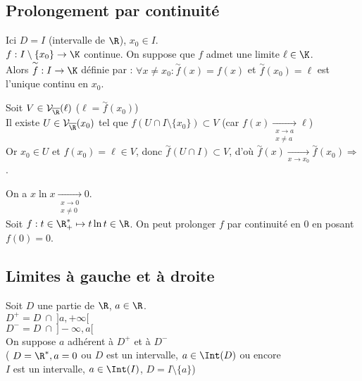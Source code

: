 \documentclass[12pt,a4paper]{report}
\begin{document}
\subsection{Prolongement par continuité}
Ici $D = I$ (intervalle de $\R$), $x_0 \in I$. \\
$f : I \setminus \{x_0\} \to \K$ continue. On suppose que $f$ admet une limite $\ell \in \K$. \\

Alors $\overset{\sim}{f} : I \to \K$ définie par : $\forall x \neq x_0 : \overset{\sim}{f}(x) = f(x)$ et $\overset{\sim}{f}(x_0) = \ell$ est l'unique  continu en $x_0$. \\

\begin{demo}

Soit $V \in \mathcal{V}_{\overline{\R}}(\ell)$ \quad ($\ell = \overset{\sim}{f}(x_0)$) \\
Il existe $U \in \mathcal{V}_{\overline{\R}}(x_0)$ tel que $f(U \cap I \setminus \{x_0\}) \subset V$ (car $f(x) \xrightarrow[\substack{x \to a \\ x \neq a}]{} \ell$) \\
Or $x_0 \in U$ et $f(x_0) = \ell \in V$, donc $\overset{\sim}{f}(U \cap I) \subset V$, d'où $\overset{\sim}{f}(x) \xrightarrow[x \to x_0]{} \overset{\sim}{f}(x_0) \Longrightarrow$ .
\end{demo}

\begin{exemple}
On a $x \ln x \xrightarrow[\substack{x \to 0 \\ x \neq 0}]{} 0$. \\
Soit $f : t \in \R_+^* \mapsto t \ln t \in \R$. On peut prolonger $f$ par continuité en $0$ en posant $f(0)=0$.
\end{exemple}

\subsection{Limites à gauche et à droite}
Soit $D$ une partie de $\R$, $a \in \R$. \\
$D^+ = D \:\cap \:]a,+\infty[$ \\
$D^- = D \: \cap \: ]-\infty,a[$ \\
On suppose $a$ adhérent à $D^+$ et à $D^-$ \\
( $D = \R^*, a=0$ ou $D$ est un intervalle, $a \in \Int(D)$ ou encore \\
$I$ est un intervalle, $a \in \Int(I)$, $D = I \setminus \{a\}$) \\
\end{document}
